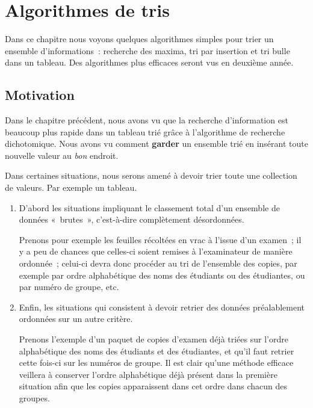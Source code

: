 \chapter{Algorithmes de tris}

	Dans ce chapitre nous voyons quelques algorithmes simples pour trier un
	ensemble d’informations~: recherche des maxima, tri par insertion et tri
	bulle dans un tableau.  Des algorithmes plus efficaces seront vus en
	deuxième année.

	\minitoc

\section{Motivation}

	Dans le chapitre précédent, nous avons vu que la recherche d’information est
	beaucoup plus rapide dans un tableau trié grâce à l’algorithme de recherche
	dichotomique.  Nous avons vu comment \textbf{garder} un ensemble trié en
	insérant toute nouvelle valeur au \emph{bon} endroit.

	Dans certaines situations, nous serons amené à devoir trier toute une
	collection de valeurs. Par exemple un tableau.

	\begin{enumerate}
	
		\item 
			D’abord les situations impliquant le classement total d’un ensemble de
			données «~brutes~», c’est-à-dire complètement désordonnées. 
			
			Prenons pour exemple les feuilles récoltées en vrac à l’issue d’un
			examen~; il y a peu de chances que celles-ci soient remises
			à l’examinateur de manière ordonnée~; celui-ci devra donc procéder
			au tri de l’ensemble des copies, par exemple par ordre alphabétique
			des noms des étudiants ou des étudiantes, ou par numéro de groupe, etc.
	
		\item 
			Enfin, les situations qui consistent à devoir retrier des données
			préalablement ordonnées sur un autre critère. 
			
			Prenons l’exemple d’un paquet de copies d’examen déjà triées sur
			l’ordre alphabétique des noms des étudiants et des étudiantes, et
			qu’il faut retrier cette fois-ci sur les numéros de groupe. Il est
			clair qu’une méthode efficace veillera à conserver l’ordre
			alphabétique déjà présent dans la première situation afin que les
			copies apparaissent dans cet ordre dans chacun des groupes.

	\end{enumerate}
	
